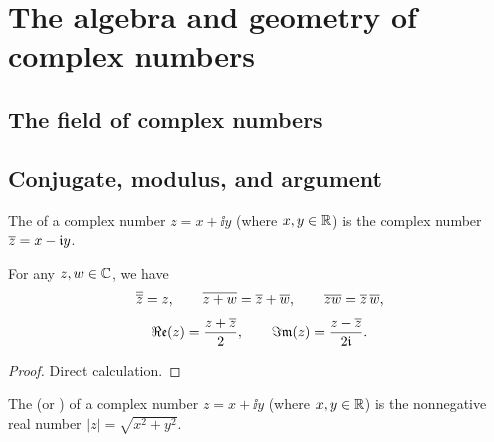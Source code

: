 \section{The algebra and geometry of complex numbers}


\subsection{The field of complex numbers}


\subsection{Conjugate, modulus, and argument}

\begin{definition}
  \label{def:complex_conjugate}
  The  of a complex number $z = x + \ii y$
  (where $x,y \in \mathbb{R}$) is the complex number $\overline{z} = x - \mathfrak{i} y$.
\end{definition}


\begin{lemma}
  \label{lem:complex_conjugate_properties}
  For any $z , w \in \mathbb{C}$, we have
  \begin{align*}
    \overline{\overline{z}} = z , \qquad
    \overline{z + w} = \overline{z} + \overline{w} , \qquad
    \overline{z w} = \overline{z} \, \overline{w} ,
  \end{align*}
  \begin{align*}
    \Re\mathfrak{e} (z) = \frac{z + \overline{z}}{2} , \qquad
    \Im\mathfrak{m} (z) = \frac{z - \overline{z}}{2 \mathfrak{i}} .
  \end{align*}
\end{lemma}
\begin{proof}
  Direct calculation.
\end{proof}

\begin{definition}
  \label{def:absolute_value}
  The  (or ) of a
  complex number $z = x + \ii y$ (where $x,y \in \mathbb{R}$)
  is the nonnegative real number $|z| = \sqrt{x^2 + y^2}$.
\end{definition}

